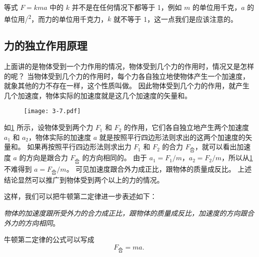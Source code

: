等式 $F=kma$ 中的 $k$ 并不是在任何情况下都等于 1，例如 $m$ 的单位用千克，$a$ 的单位用\unit{/^2}，而力的单位用千克力，$k$ 就不等于 1，这一点我们是应该注意的。

\subsection{力的独立作用原理}
上面讲的是物体受到一个力作用的情况，物体受到几个力的作用时，情况又是怎样的呢？
当物体受到几个力的作用时，每个力各自独立地使物体产生一个加速度，就象其他的力不存在一样，这个性质叫做。
因此物体受到几个力的作用，就产生几个加速度，物体实际的加速度就是这几个加速度的矢量和。
\begin{figure}
  \texttt{[image: 3-7.pdf]}
  \caption{}\label{fig:3-7}
\end{figure}

如\cref{fig:3-7} 所示，设物体受到两个力 $F_1$ 和 $F_2$ 的作用，它们各自独立地产生两个加速度 $a_1$ 和 $a_2$，物体实际的加速度 $a$ 就是按照平行四边形法则求出的这两个加速度的矢量和。
如果再按照平行四边形法则求出力 $F_1$ 和 $F_2$ 的合力 $F_\text{合}$，就可以看出加速度 $a$ 的方向是跟合力 $F_\text{合}$ 的方向相同的。
由于 $a_1=F_1/m$，$a_2=F_2/m$，所以从\cref{fig:3-7} 不难得到 $a=F_\text{合}/m$。
可见加速度跟合外力成正比，跟物体的质量成反比。
上述结论显然可以推广到物体受到两个以上的力的情况。

这样，我们可以把牛顿第二定律进一步表述如下：

\emph{物体的加速度跟所受外力的合力成正比，跟物体的质量成反比，加速度的方向跟合外力的方向相同}。

牛顿第二定律的公式可以写成
\[F_{\text{合}}=ma.\]


